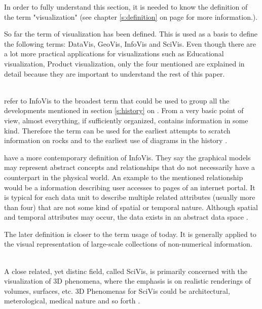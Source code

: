 In order to fully understand this section, it is needed to know the definition of the term "visualization" (see chapter \ref{s:definition} on page \pageref{s:definition} for more information.).

So far the term of visualization has been defined. This is used as a basis to define the following terms: \ac{DataVis}, \ac{GeoVis}, \ac{InfoVis} and \ac{SciVis}. Even though there are a lot more practical applications for visualizations such as Educational visualization, Product visualization, only the four mentioned are explained in detail because they are important to understand the rest of this paper.

\begin{enumerate}

 \hfill \\
\citeauthor{Friendly.2001} refer to \ac{InfoVis} to the broadest term that could be used to group all the developments mentioned in section \ref{s:history} on \pageref{s:history}. From a very basic point of view, almost everything, if sufficiently organized, contains information in some kind. Therefore the term can be used for the earliest attempts to scratch information on rocks and to the earliest use of diagrams in the history .

\citeauthor{Ferreira2003} have a more contemporary definition of \ac{InfoVis}. They say the graphical models may represent abstract concepts and relationships that do not necessarily have a counterpart in the physical world. An example to the mentioned relationship would be a information describing user accesses to pages of an internet portal. It is typical for each data unit to describe multiple related attributes (usually more than four) that are not some kind of spatial or temporal nature. Although spatial and temporal attributes may occur, the data exists in an abstract data space .

The later definition is closer to the term usage of today. It is generally applied to the visual representation of large-scale collections of non-numerical information.

 \hfill \\
A close related, yet distinc field, called \ac{SciVis}, is primarily concerned with the visualization of 3D phenomena, where the emphasis is on realistic renderings of volumes, surfaces, etc. 3D Phenomenas for \ac{SciVis} could be architectural, meterological, medical nature and so forth .


\end{enumerate}
